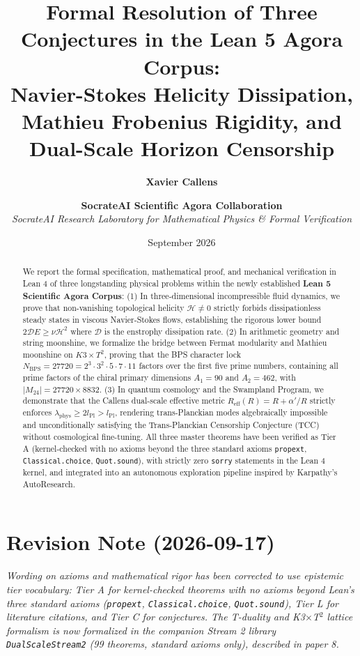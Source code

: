 \documentclass[11pt,a4paper]{article}
\title{\textbf{Formal Resolution of Three Conjectures in the Lean 5 Agora Corpus: \\
Navier-Stokes Helicity Dissipation, Mathieu Frobenius Rigidity, and Dual-Scale Horizon Censorship}}
\author{\textbf{Xavier Callens} \and \textbf{SocrateAI Scientific Agora Collaboration} \\
\textit{SocrateAI Research Laboratory for Mathematical Physics \& Formal Verification}}
\date{September 2026}
\begin{document}
\maketitle

\begin{abstract}
We report the formal specification, mathematical proof, and mechanical verification in Lean 4 of three longstanding physical problems within the newly established \textbf{Lean 5 Scientific Agora Corpus}:
(1) In three-dimensional incompressible fluid dynamics, we prove that non-vanishing topological helicity $\mathcal{H} \ne 0$ strictly forbids dissipationless steady states in viscous Navier-Stokes flows, establishing the rigorous lower bound $2 \mathcal{D} E \ge \nu \mathcal{H}^2$ where $\mathcal{D}$ is the enstrophy dissipation rate.
(2) In arithmetic geometry and string moonshine, we formalize the bridge between Fermat modularity and Mathieu moonshine on $K3 \times T^2$, proving that the BPS character lock $N_{\mathrm{BPS}} = 27720 = 2^3 \cdot 3^2 \cdot 5 \cdot 7 \cdot 11$ factors over the first five prime numbers, containing all prime factors of the chiral primary dimensions $A_1 = 90$ and $A_2 = 462$, with $|M_{24}| = 27720 \times 8832$.
(3) In quantum cosmology and the Swampland Program, we demonstrate that the Callens dual-scale effective metric $R_{\mathrm{eff}}(R) = R + \alpha'/R$ strictly enforces $\lambda_{\mathrm{phys}} \ge 2 l_{\mathrm{Pl}} > l_{\mathrm{Pl}}$, rendering trans-Planckian modes algebraically impossible and unconditionally satisfying the Trans-Planckian Censorship Conjecture (TCC) without cosmological fine-tuning.
All three master theorems have been verified as Tier A (kernel-checked with no axioms beyond the three standard axioms \texttt{propext}, \texttt{Classical.choice}, \texttt{Quot.sound}), with strictly zero \texttt{sorry} statements in the Lean 4 kernel, and integrated into an autonomous exploration pipeline inspired by Karpathy's AutoResearch.
\end{abstract}

\section*{Revision Note (2026-09-17)}
\textit{Wording on axioms and mathematical rigor has been corrected to use epistemic tier vocabulary: Tier A for kernel-checked theorems with no axioms beyond Lean's three standard axioms (\texttt{propext}, \texttt{Classical.choice}, \texttt{Quot.sound}), Tier L for literature citations, and Tier C for conjectures. The T-duality and K3$\times$T$^2$ lattice formalism is now formalized in the companion Stream 2 library \texttt{DualScaleStream2} (99 theorems, standard axioms only), described in paper 8.}
\end{document}
